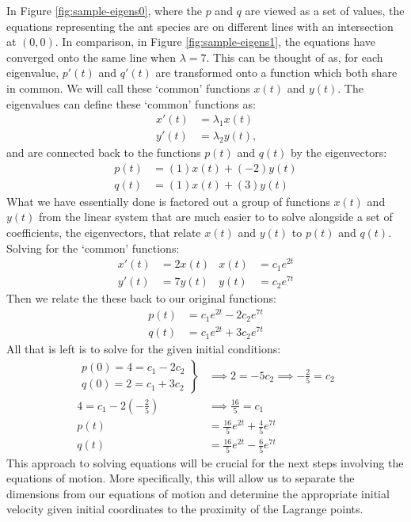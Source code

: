 In Figure \ref{fig:sample-eigens0}, where the $p$ and $q$ are viewed as a set of values, the equations representing the ant species are on different lines with an intersection at $(0,0)$. 
In comparison, in Figure \ref{fig:sample-eigens1}, the equations have converged onto the same line when $\lambda = 7$.
This can be thought of as, for each eigenvalue, $p'(t)$ and $q'(t)$ are transformed onto a function which both share in common.
We will call these `common' functions $x(t)$ and $y(t)$.
The eigenvalues can define these `common' functions as:
\begin{align*}
	x'(t) &= \lambda_1 x(t) \\
	y'(t) &= \lambda_2 y(t) \text{,}
\end{align*}
and are connected back to the functions $p(t)$ and $q(t)$ by the eigenvectors:
\begin{align*}
	p(t) &= (1)x(t) + (-2)y(t) \\
	q(t) &= (1)x(t) + (3)y(t)
\end{align*}
What we have essentially done is factored out a group of functions $x(t)$ and $y(t)$ from the linear system that are much easier to to solve alongside a set of coefficients, the eigenvectors, that relate $x(t)$ and $y(t)$ to $p(t)$ and $q(t)$.
Solving for the `common' functions:
\begin{align*}
	x'(t) &= 2x(t) & x(t) &= c_1e^{2t} \\
	y'(t) &= 7y(t) & y(t) &= c_2e^{7t}
\end{align*}
Then we relate the these back to our original functions:
\begin{align*}
	p(t) &= c_1e^{2t} - 2c_2e^{7t} \\
	q(t) &= c_1e^{2t} + 3c_2e^{7t}
\end{align*}
All that is left is to solve for the given initial conditions:
\begin{align*}
	\left. \begin{array}{l}
		p(0) = 4 = c_1 - 2c_2 \\
		q(0) = 2 = c_1 + 3c_2
	\end{array} \right \} &\implies 2 = -5c_2 \implies -\frac{2}{5} = c_2 \\
	4 = c_1 - 2\left(-\frac{2}{5}\right) &\implies \frac{16}{5} = c_1 \\
	p(t) &= \frac{16}{5}e^{2t} + \frac{4}{5}e^{7t} \\
	q(t) &= \frac{16}{5}e^{2t} - \frac{6}{5}e^{7t}
\end{align*}
This approach to solving equations will be crucial for the next steps involving the equations of motion.
More specifically, this will allow us to separate the dimensions from our equations of motion and determine the appropriate initial velocity given initial coordinates to the proximity of the Lagrange points.